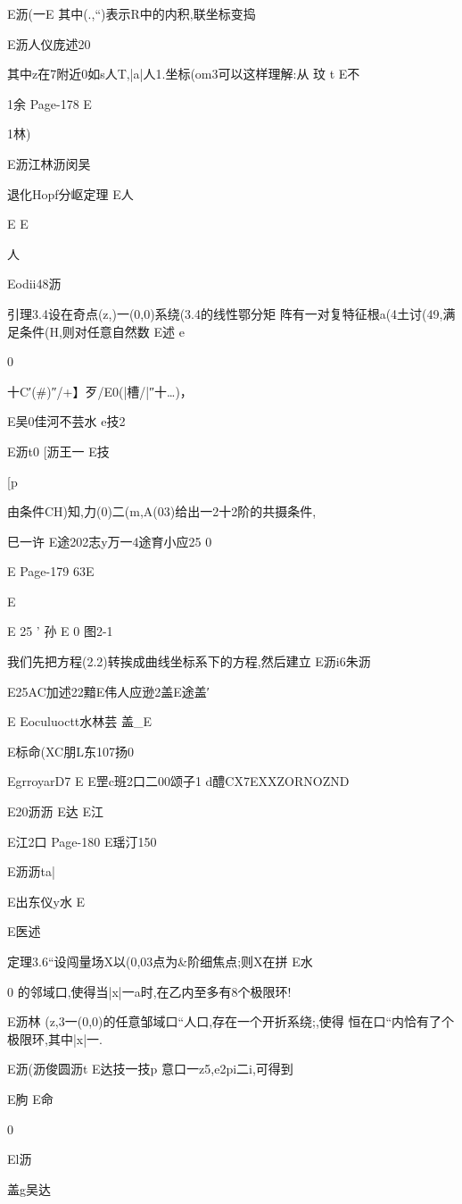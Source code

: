 {{{{{{{{{{{{{{{{{{E沥(一E
其中(.,“)表示R中的内积,联坐标变捣

E沥人仪庞述20

其中z在7附近0如s人T,|a|人1.坐标(om3可以这样理解:从
玟
t
E不

1余
Page-178
E

1林)

E沥江林沥闵吴

退化Hopf分岖定理
E人

E
E

人

Eodii48沥

引理3.4设在奇点(z,)一(0,0)系绕(3.4的线性鄂分矩
阵有一对复特征根a(4土讨(49,满足条件(H,则对任意自然数
E述
e

0

十C′(#)″/+】歹/E0(|槽/|″十…)，

E吴0佳河不芸水
e技2

E沥t0
[沥王一
E技

[p

由条件CH)知,力(0)二(m,A(03)给出一2十2阶的共摄条件,

巳一许
E途202志y万一4途育小应25
0

E
Page-179
63E

E

E
25
'
孙
E
0
图2-1

我们先把方程(2.2)转挨成曲线坐标系下的方程,然后建立
E沥i6朱沥

E25AC加述22黯E伟人应逊2盖E途盖′

E
Eoculuoctt水林芸
盖_E

E标命(XC朋L东107扬0

EgrroyarD7
E
E罡c班2口二00颂子1
d醴CX7EXXZORNOZND

E20沥沥
E达
E江

E江2口
Page-180
E瑶汀150

E沥沥ta|

E出东仪y水
E

E医述

定理3.6“设闯量场X以(0,03点为&阶细焦点;则X在拼
E水

0
的邻域口,使得当|x|一a时,在乙内至多有8个极限环!

E沥林
(z,3一(0,0)的任意邹域口“人口,存在一个开折系绕;,使得
恒在口“内恰有了个极限环,其中|x|一.

E沥(沥俊圆沥t
E达技一技p
意口一z5,e2pi二i,可得到

{E朐
E命

0

El沥

盖g吴达

}}}}}}}}}}}}}}}}}}}
